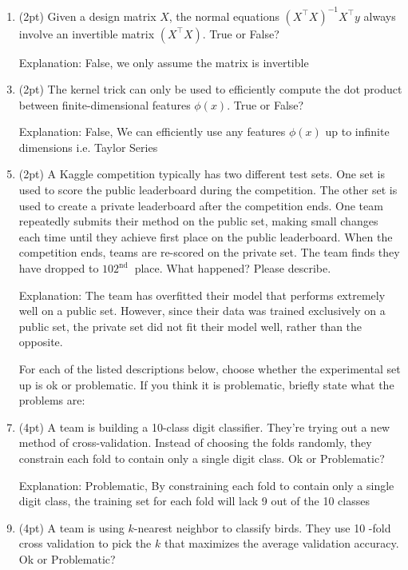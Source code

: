 \documentclass[10pt, a4paper]{article}
\begin{document}
\begin{enumerate}[label=(\alph*)]
    \item (2pt) Given a design matrix $X$, the normal equations $\left(X^{\top} X\right)^{-1} X^{\top} y$ always involve an invertible matrix $\left(X^{\top} X\right)$. True or False?

    \item[Explanation:] False, we only assume the matrix is invertible

    \item (2pt) The kernel trick can only be used to efficiently compute the dot product between finite-dimensional features $\phi(x)$. True or False?

    \item[Explanation:] False, We can efficiently use any features $\phi(x)$ up to infinite dimensions i.e. Taylor Series

    \item (2pt) A Kaggle competition typically has two different test sets. One set is used to score the public leaderboard during the competition. The other set is used to create a private leaderboard after the competition ends. One team repeatedly submits their method on the public set, making small changes each time until they achieve first place on the public leaderboard. When the competition ends, teams are re-scored on the private set. The team finds they have dropped to $102^{\text {nd }}$ place. What happened? Please describe.

    \item[Explanation:] The team has overfitted their model that performs extremely well on a public set. However, since their data was trained exclusively on a public set, the private set did not fit their model well, rather than the opposite.

    For each of the listed descriptions below, choose whether the experimental set up is ok or problematic. If you think it is problematic, briefly state what the problems are:

    \item (4pt) A team is building a 10-class digit classifier. They're trying out a new method of cross-validation. Instead of choosing the folds randomly, they constrain each fold to contain only a single digit class. Ok or Problematic?

    \item[Explanation:] Problematic, By constraining each fold to contain only a single digit class, the training set for each fold will lack 9 out of the 10 classes

    \item (4pt) A team is using $k$-nearest neighbor to classify birds. They use 10 -fold cross validation to pick the $k$ that maximizes the average validation accuracy. Ok or Problematic?


\end{enumerate}
\end{document}
